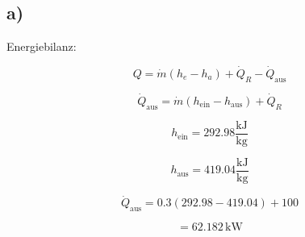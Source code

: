 

\subsection*{a)}

Energiebilanz:

\[
Q = \dot{m} (h_e - h_a) + \dot{Q}_R - \dot{Q}_{\text{aus}}
\]

\[
\dot{Q}_{\text{aus}} = \dot{m} (h_{\text{ein}} - h_{\text{aus}}) + \dot{Q}_{R}
\]

\[
h_{\text{ein}} = 292.98 \frac{\text{kJ}}{\text{kg}}
\]

\[
h_{\text{aus}} = 419.04 \frac{\text{kJ}}{\text{kg}}
\]

\[
\dot{Q}_{\text{aus}} = 0.3 \left( 292.98 - 419.04 \right) + 100
\]

\[
= 62.182 \, \text{kW}
\]